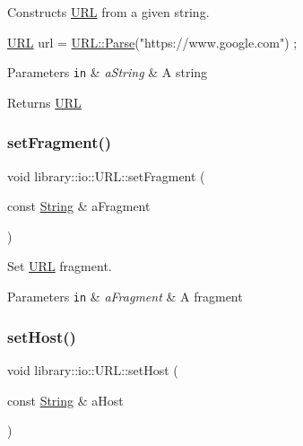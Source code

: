 Constructs \hyperlink{classlibrary_1_1io_1_1_u_r_l}{U\+RL} from a given string. 


\begin{DoxyCode}
\hyperlink{classlibrary_1_1io_1_1_u_r_l_a7e9c070138a6dbd000ffb10b7cd8a5c4}{URL} url = \hyperlink{classlibrary_1_1io_1_1_u_r_l_a98cf42141cf75e1dd5362eb208a1e2bd}{URL::Parse}(\textcolor{stringliteral}{"https://www.google.com"}) ;
\end{DoxyCode}



\begin{DoxyParams}[1]{Parameters}
\mbox{\tt in}  & {\em a\+String} & A string \\
\hline
\end{DoxyParams}
\begin{DoxyReturn}{Returns}
\hyperlink{classlibrary_1_1io_1_1_u_r_l}{U\+RL} 
\end{DoxyReturn}
\mbox{\label{classlibrary_1_1io_1_1_u_r_l_a0ae406ca81b40b02761918ad953a4255}} 
\subsubsection{\texorpdfstring{set\+Fragment()}{setFragment()}}
{\footnotesize\ttfamily void library\+::io\+::\+U\+R\+L\+::set\+Fragment (\begin{DoxyParamCaption}\item[{const \hyperlink{namespacelibrary_1_1io_a7469b45835a4421045db344d6a5a1f85}{String} \&}]{a\+Fragment }\end{DoxyParamCaption})}



Set \hyperlink{classlibrary_1_1io_1_1_u_r_l}{U\+RL} fragment. 


\begin{DoxyParams}[1]{Parameters}
\mbox{\tt in}  & {\em a\+Fragment} & A fragment \\
\hline
\end{DoxyParams}
\mbox{\label{classlibrary_1_1io_1_1_u_r_l_ab11ded07b47b35dbc0bb6907c0cfd5c5}} 
\subsubsection{\texorpdfstring{set\+Host()}{setHost()}}
{\footnotesize\ttfamily void library\+::io\+::\+U\+R\+L\+::set\+Host (\begin{DoxyParamCaption}\item[{const \hyperlink{namespacelibrary_1_1io_a7469b45835a4421045db344d6a5a1f85}{String} \&}]{a\+Host }\end{DoxyParamCaption})}



